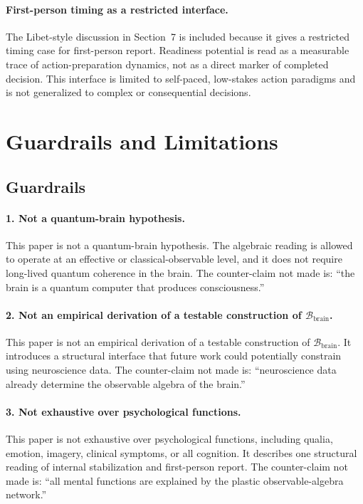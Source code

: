 \documentclass[12pt]{article}
\theoremstyle{definition}
\theoremstyle{remark}
\newcommand{\Bbrain}{\mathcal B_{\mathrm{brain}}}
\begin{document}
\paragraph{First-person timing as a restricted interface.}
The Libet-style discussion in Section~7 is included because it gives a
restricted timing case for first-person report. Readiness potential is
read as a measurable trace of action-preparation dynamics, not as a
direct marker of completed decision. This interface is limited to
self-paced, low-stakes action paradigms and is not generalized to
complex or consequential decisions.

\section{Guardrails and Limitations}

\subsection{Guardrails}

\paragraph{1. Not a quantum-brain hypothesis.}
This paper is not a quantum-brain hypothesis. The algebraic reading is
allowed to operate at an effective or classical-observable level, and it
does not require long-lived quantum coherence in the brain. The
counter-claim not made is: ``the brain is a quantum computer that
produces consciousness.''

\paragraph{2. Not an empirical derivation of a testable construction of \(\Bbrain\).}
This paper is not an empirical derivation of a testable construction of
\(\Bbrain\). It introduces a structural interface that future work could
potentially constrain using neuroscience data. The counter-claim not
made is: ``neuroscience data already determine the observable algebra of
the brain.''

\paragraph{3. Not exhaustive over psychological functions.}
This paper is not exhaustive over psychological functions, including
qualia, emotion, imagery, clinical symptoms, or all cognition. It
describes one structural reading of internal stabilization and
first-person report. The counter-claim not made is: ``all mental
functions are explained by the plastic observable-algebra network.''
\end{document}

